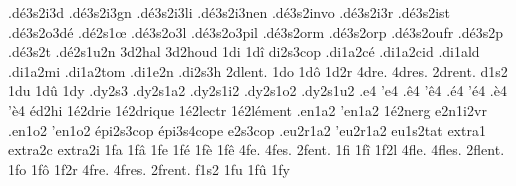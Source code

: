 {                    .dé3s2i3d
                    .dé3s2i3gn
                    .dé3s2i3li
                    .dé3s2i3nen
                    .dé3s2invo
                    .dé3s2i3r
                    .dé3s2ist
                    .dé3s2o3dé
                    .dé2s1œ
                    .dé3s2o3l
                    .dé3s2o3pil
                    .dé3s2orm
                    .dé3s2orp
                    .dé3s2oufr
                    .dé3s2p %
                    .dé3s2t %
                    .dé2s1u2n
                    3d2hal
                    3d2houd
1di
1dî
                    di2s3cop
                    .di1a2cé
                    .di1a2cid
                    .di1ald
                    .di1a2mi
                    .di1a2tom
                    .di1e2n
                    .di2s3h
2dlent. %
1do
1dô
1d2r
4dre.
4dres.
2drent. %
d1s2
1du
1dû
1dy
                    .dy2s3
                    .dy2s1a2
                    .dy2s1i2
                    .dy2s1o2 %
                    .dy2s1u2
.e4
'e4
.ê4
'ê4
.é4
'é4
.è4
'è4
éd2hi %
                    1é2drie
                    1é2drique
                    1é2lectr
                    1é2lément
                    .en1a2
                    'en1a2
                    1é2nerg
                    e2n1i2vr
                    .en1o2
                    'en1o2
                    épi2s3cop
                    épi3s4cope
                    e2s3cop
                    .eu2r1a2
                    'eu2r1a2
                    eu1s2tat
                    extra1
                    extra2c
                    extra2i
1fa
1fâ
1fe
1fé
1fè
1fê
4fe.
4fes.
2fent. %
%
1fi
1fî
1f2l
4fle.
4fles.
2flent. %
1fo
1fô
1f2r
4fre.
4fres.
2frent. %
f1s2
1fu
1fû
1fy
}
